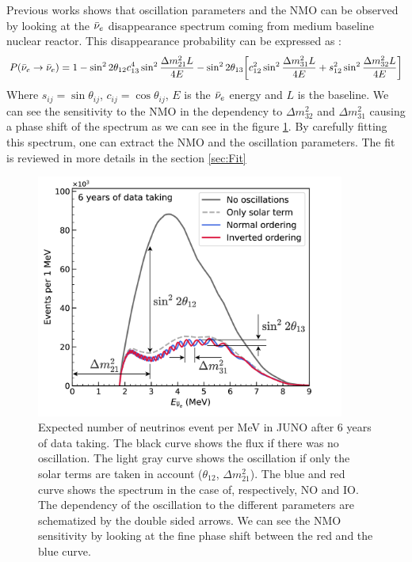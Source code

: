 Previous works \cite{zhan_determination_2008,  zhan_experimental_2009} shows that oscillation parameters and the NMO can be observed by looking at the $\bar{\nu}_{e}$ disappearance spectrum coming from medium baseline nuclear reactor. This disappearance probability can be expressed as \cite{an_neutrino_2016} :
\begin{equation*}
  P(\bar{\nu}_{e} \rightarrow \bar{\nu}_{e}) = 1 - \sin^2 2\theta_{12} c^4_{13} \sin^2 \frac{\Delta m^2_{21}L}{4E} - \sin^2 2\theta_{13} \bigg[ c_{12}^2 \sin^2 \frac{\Delta m_{31}^2 L}{4E} + s^2_{12} \sin^2 \frac{\Delta m_{32}^2 L}{4E} \bigg]
\end{equation*}
Where $s_{ij} = \sin \theta_{ij}$, $c_{ij} = \cos \theta_{ij}$, $E$ is the $\bar{\nu}_{e}$ energy and $L$ is the baseline.
We can see the sensitivity to the NMO in the dependency to $\Delta m_{32}^2$ and $\Delta m^2_{31}$ causing a phase shift of the spectrum as we can see in the figure \ref{fig:juno-spectrum-oscillation}.
By carefully fitting this spectrum, one can extract the NMO and the oscillation parameters. The fit is reviewed in more details in the section \ref{sec:Fit}

\begin{figure}
  \centering
  \includegraphics[height=8cm]{images/juno/Spectrum-OscillationsOnly_dm2_31.png}
  \caption{Expected number of neutrinos event per MeV in JUNO after 6 years of data taking. The black curve shows the flux if there was no oscillation. The light gray curve shows the oscillation if only the solar terms are taken in account ($\theta_{12}$, $\Delta m_{21}^2$). The blue and red curve shows the spectrum in the case of, respectively, NO and IO. The dependency of the oscillation to the different parameters are schematized by the double sided arrows. We can see the NMO sensitivity by looking at the fine phase shift between the red and the blue curve.}
  \label{fig:juno-spectrum-oscillation}
\end{figure}

